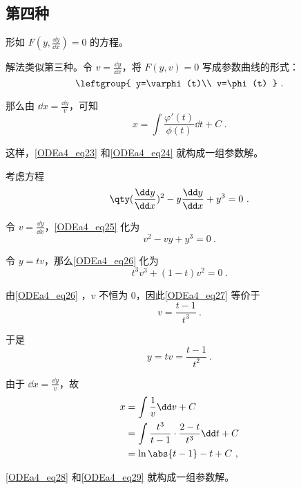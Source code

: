 \subsection{第四种}

形如 $F(y, \frac{\dd y}{\dd x})=0$ 的方程。

解法类似第三种。令 $v=\frac{\dd y}{\dd x}$，将 $F(y, v)=0$ 写成参数曲线的形式：
\begin{equation}\label{ODEa4_eq23}
\leftgroup{
    y=\varphi(t)\\
    v=\phi(t)
}~.
\end{equation}

那么由 $\dd x=\frac{\dd y}{v}$，可知
\begin{equation}\label{ODEa4_eq24}
x=\int \frac{\varphi'(t)}{\phi(t)}\dd t+C~.
\end{equation}

这样，\autoref{ODEa4_eq23} 和\autoref{ODEa4_eq24} 就构成一组参数解。

\begin{example}{}
考虑方程
\begin{equation}\label{ODEa4_eq25}
\qty(\frac{\dd y}{\dd x})^2-y\frac{\dd y}{\dd x}+y^3=0~.
\end{equation}

令 $v=\frac{\dd y}{\dd x}$，\autoref{ODEa4_eq25} 化为
\begin{equation}\label{ODEa4_eq26}
v^2-vy+y^3=0~.
\end{equation}

令 $y=tv$，那么\autoref{ODEa4_eq26} 化为
\begin{equation}\label{ODEa4_eq27}
t^3v^3+(1-t)v^2=0~.
\end{equation}

由\autoref{ODEa4_eq26} ，$v$ 不恒为 $0$，因此\autoref{ODEa4_eq27} 等价于
\begin{equation}
v=\frac{t-1}{t^3}~.
\end{equation}

于是
\begin{equation}\label{ODEa4_eq28}
y=tv=\frac{t-1}{t^2}~.
\end{equation}

由于 $\dd x=\frac{\dd y}{v}$，故
\begin{equation}\label{ODEa4_eq29}
\begin{aligned}
x
&=\int \frac{1}{v} \dd v+C\\
&=\int \frac{t^3}{t-1}\cdot\frac{2-t}{t^3}\dd t+C\\
&=\ln\abs{t-1}-t+C~,
\end{aligned}
\end{equation}

\autoref{ODEa4_eq28} 和\autoref{ODEa4_eq29} 就构成一组参数解。








\end{example}











